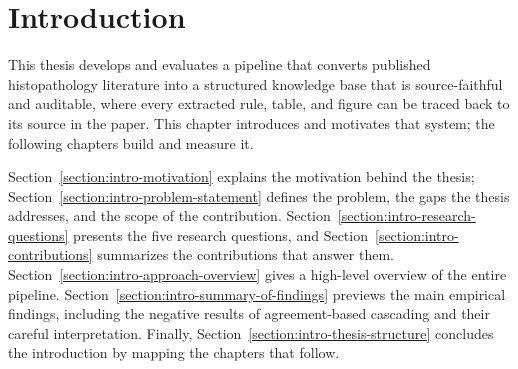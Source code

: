 
\chapter{Introduction}\label{chapter:introduction}

This thesis develops and evaluates a pipeline that converts published histopathology literature into a structured knowledge base that is source-faithful and auditable, where every extracted rule, table, and figure can be traced back to its source in the paper. This chapter introduces and motivates that system; the following chapters build and measure it. 

Section~\ref{section:intro-motivation} explains the motivation behind the thesis; Section~\ref{section:intro-problem-statement} defines the problem, the gaps the thesis addresses, and the scope of the contribution. Section~\ref{section:intro-research-questions} presents the five research questions, and Section~\ref{section:intro-contributions} summarizes the contributions that answer them. Section~\ref{section:intro-approach-overview} gives a high-level overview of the entire pipeline. Section~\ref{section:intro-summary-of-findings} previews the main empirical findings, including the negative results of agreement-based cascading and their careful interpretation. Finally, Section~\ref{section:intro-thesis-structure} concludes the introduction by mapping the chapters that follow. 








